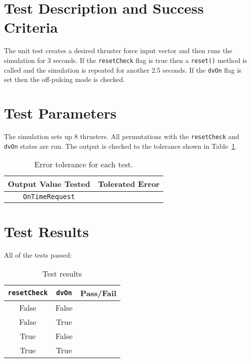 
\section{Test Description and Success Criteria}
The unit test creates a desired thruster force input vector and then runs the simulation for 3 seconds.  If the {\tt resetCheck} flag is true then a {\tt reset()} method is called and the simulation is repeated for another 2.5 seconds.  If the {\tt dvOn} flag is set then the off-pulsing mode is checked.  




\section{Test Parameters}

The simulation sets up 8 thrusters.  All permutations with the {\tt resetCheck} and {\tt dvOn} states are run.  The output is checked to the tolerance shown in Table~\ref{tab:errortol}.

\begin{table}[htbp]
	\caption{Error tolerance for each test.}
	\label{tab:errortol}
	\centering \fontsize{10}{10}\selectfont
	\begin{tabular}{ c | c } %
		\hline\hline
		\textbf{Output Value Tested}  & \textbf{Tolerated Error}  \\ 
		\hline
		{\tt OnTimeRequest}        & 	   \\ 
		\hline\hline
	\end{tabular}
\end{table}




\section{Test Results}
All of the tests passed:
\begin{table}[H]
	\caption{Test results}
	\label{tab:results}
	\centering \fontsize{10}{10}\selectfont
	\begin{tabular}{c | c  | c } %
		\hline\hline
		{\tt resetCheck} & {\tt dvOn} &\textbf{Pass/Fail} \\ 
		\hline
	   False & False	   			&  \\ 
	   False & True	   			&  \\ 
	   True & False	   			&  \\ 
	   True & True	   			&  \\ 
	   \hline\hline
	\end{tabular}
\end{table}



